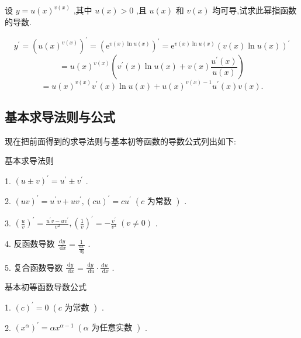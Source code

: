 \begin{example}
设 \(y = u{\left( x\right) }^{v\left( x\right) }\) ,其中 \(u\left( x\right)  > 0\) ,且 \(u\left( x\right)\) 和 \(v\left( x\right)\) 均可导,试求此幂指函数的导数.
\end{example}


\begin{solution}
\[
{y}^{\prime } = {\left( u{\left( x\right) }^{v\left( x\right) }\right) }^{\prime } = {\left( {\mathrm{e}}^{v\left( x\right) \ln u\left( x\right) }\right) }^{\prime } = {\mathrm{e}}^{v\left( x\right) \ln u\left( x\right) }{\left( v\left( x\right) \ln u\left( x\right) \right) }^{\prime }
\]
\[
= u{\left( x\right) }^{v\left( x\right) }\left( {{v}^{\prime }\left( x\right) \ln u\left( x\right)  + v\left( x\right) \frac{{u}^{\prime }\left( x\right) }{u\left( x\right) }}\right)
\]
\[
= u{\left( x\right) }^{v\left( x\right) }{v}^{\prime }\left( x\right) \ln u\left( x\right)  + u{\left( x\right) }^{v\left( x\right)  - 1}{u}^{\prime }\left( x\right) v\left( x\right) .
\]
\end{solution}

\subsection{基本求导法则与公式}

现在把前面得到的求导法则与基本初等函数的导数公式列出如下:

基本求导法则

1. \({\left( u \pm  v\right) }^{\prime } = {u}^{\prime } \pm  {v}^{\prime }\) .

2. \({\left( uv\right) }^{\prime } = {u}^{\prime }v + u{v}^{\prime },{\left( cu\right) }^{\prime } = c{u}^{\prime }\;\left( {c\text{ 为常数 }}\right)\) .

3. \({\left( \frac{u}{v}\right) }^{\prime } = \frac{{u}^{\prime }v - u{v}^{\prime }}{{v}^{2}},{\left( \frac{1}{v}\right) }^{\prime } =  - \frac{{v}^{\prime }}{{v}^{2}}\;\left( {v \neq  0}\right)\) .

4. 反函数导数 \(\frac{\mathrm{d}y}{\mathrm{\;d}x} = \frac{1}{\frac{\mathrm{d}x}{\mathrm{\;d}y}}\) .

5. 复合函数导数 \(\frac{\mathrm{d}y}{\mathrm{\;d}x} = \frac{\mathrm{d}y}{\mathrm{\;d}u} \cdot  \frac{\mathrm{d}u}{\mathrm{\;d}x}\) .

基本初等函数导数公式

1. \({\left( c\right) }^{\prime } = 0\;\left( {c\text{ 为常数 }}\right)\) .

2. \({\left( {x}^{\alpha }\right) }^{\prime } = \alpha {x}^{\alpha  - 1}\;\left( {\alpha \text{ 为任意实数 }}\right)\) .

